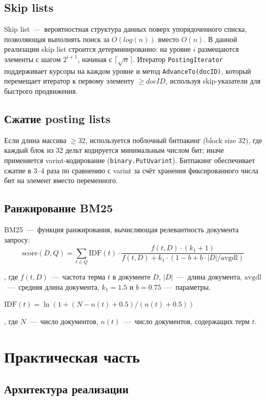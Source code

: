 \documentclass{itmo}
\begin{document}
\section{Skip lists}

Skip list~---~вероятностная структура данных поверх упорядоченного списка, позволяющая выполнять поиск за $O(log(n))$ вместо $O(n)$.
В данной реализации skip list строится детерминированно: на уровне $i$ размещаются элементы с шагом $2^{i+1}$, начиная с $\lceil\sqrt{n}\rceil$.
Итератор \texttt{PostingIterator} поддерживает курсоры на каждом уровне и метод \texttt{AdvanceTo(docID)}, который перемещает итератор к первому элементу $\geq docID$, используя skip-указатели для быстрого продвижения.

\section{Сжатие posting lists}

Если длина массива $\geq 32$, используется поблочный битпакинг (block size 32), где каждый блок из 32 дельт кодируется минимальным числом бит; иначе применяется varint-кодирование (\texttt{binary.PutUvarint}).
Битпакинг обеспечивает сжатие в 3--4 раза по сравнению с varint за счёт хранения фиксированного числа бит на элемент вместо переменного.

\section{Ранжирование BM25}

BM25~---~функция ранжирования, вычисляющая релевантность документа запросу:
\[
	\text{score}(D, Q) = \sum_{t \in Q} \text{IDF}(t) \cdot \frac{f(t, D) \cdot (k_1 + 1)}{f(t, D) + k_1 \cdot (1 - b + b \cdot |D| / \text{avgdl})}
\]

, где $f(t, D)$~---~частота терма $t$ в документе $D$, 
$|D|$~---~длина документа,
$\text{avgdl}$~---~средняя длина документа,
$k_1 = 1.5$ и $b = 0.75$~---~параметры.

$\text{IDF}(t) = \ln(1 + (N - n(t) + 0.5) / (n(t) + 0.5))$

, где $N$~---~число документов,
$n(t)$~---~число документов, содержащих терм $t$.

\chapter{Практическая часть}

\section{Архитектура реализации}
\end{document}
